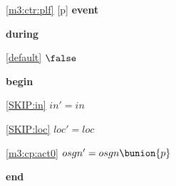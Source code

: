 \noindent \ref{m3:ctr:plf} [p] \textbf{event}
\begin{block}
\item \textbf{during}
\begin{block}
\item[ \eqref{default} ]$\false$ %
\end{block}
\item \textbf{begin}
\begin{block}
\item[ \eqref{SKIP:in} ]$in' = in$ %
\item[ \eqref{SKIP:loc} ]$loc' = loc$ %
\item[ \eqref{m3:cp:act0} ]$osgn' = osgn \bunion \{ p \} $ %
\end{block}
\item \textbf{end} \\
\end{block}
